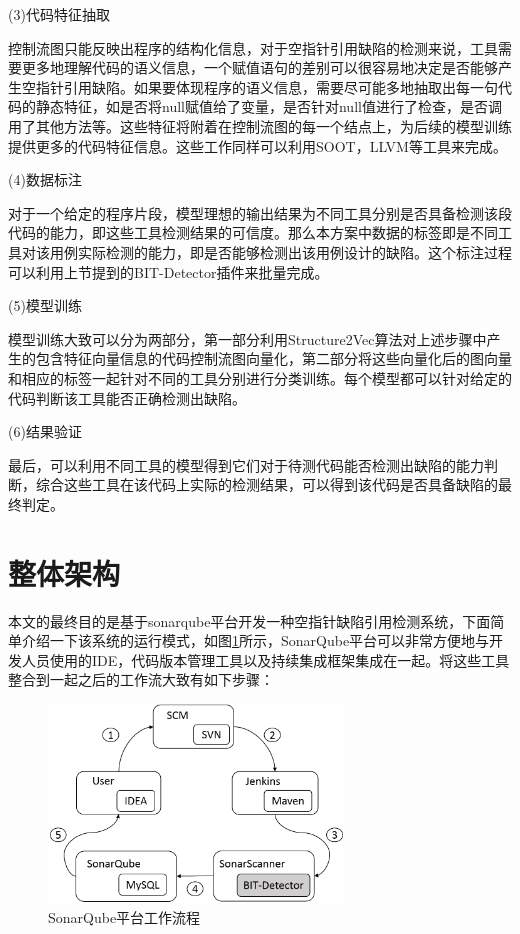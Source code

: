 (3)代码特征抽取

控制流图只能反映出程序的结构化信息，对于空指针引用缺陷的检测来说，工具需要更多地理解代码的语义信息，一个赋值语句的差别可以很容易地决定是否能够产生空指针引用缺陷。如果要体现程序的语义信息，需要尽可能多地抽取出每一句代码的静态特征，如是否将null赋值给了变量，是否针对null值进行了检查，是否调用了其他方法等。这些特征将附着在控制流图的每一个结点上，为后续的模型训练提供更多的代码特征信息。这些工作同样可以利用SOOT，LLVM等工具来完成。

(4)数据标注

对于一个给定的程序片段，模型理想的输出结果为不同工具分别是否具备检测该段代码的能力，即这些工具检测结果的可信度。那么本方案中数据的标签即是不同工具对该用例实际检测的能力，即是否能够检测出该用例设计的缺陷。这个标注过程可以利用上节提到的BIT-Detector插件来批量完成。

(5)模型训练

模型训练大致可以分为两部分，第一部分利用Structure2Vec算法对上述步骤中产生的包含特征向量信息的代码控制流图向量化，第二部分将这些向量化后的图向量和相应的标签一起针对不同的工具分别进行分类训练。每个模型都可以针对给定的代码判断该工具能否正确检测出缺陷。

(6)结果验证

最后，可以利用不同工具的模型得到它们对于待测代码能否检测出缺陷的能力判断，综合这些工具在该代码上实际的检测结果，可以得到该代码是否具备缺陷的最终判定。

\section{整体架构}

本文的最终目的是基于sonarqube平台开发一种空指针缺陷引用检测系统，下面简单介绍一下该系统的运行模式，如图\ref{fig:figure3-2}所示，SonarQube平台可以非常方便地与开发人员使用的IDE，代码版本管理工具以及持续集成框架集成在一起。将这些工具整合到一起之后的工作流大致有如下步骤：

\begin{figure}
	\centering
	\includegraphics[width=0.70\textwidth]{figures/sonarqube3-2}
	\caption{SonarQube平台工作流程}\label{fig:figure3-2}
\end{figure}


